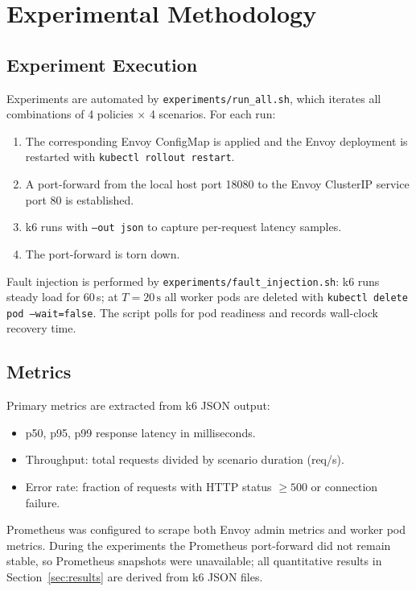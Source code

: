 \documentclass[conference]{IEEEtran}
\begin{document}
\section{Experimental Methodology}
\label{sec:methodology}

\subsection{Experiment Execution}

Experiments are automated by \texttt{experiments/run\_all.sh}, which iterates
all combinations of 4 policies $\times$ 4 scenarios.
For each run:
\begin{enumerate}
  \item The corresponding Envoy ConfigMap is applied and the Envoy deployment
        is restarted with \texttt{kubectl rollout restart}.
  \item A port-forward from the local host port 18080 to the Envoy ClusterIP
        service port 80 is established.
  \item k6 runs with \texttt{--out json} to capture per-request latency samples.
  \item The port-forward is torn down.
\end{enumerate}

Fault injection is performed by \texttt{experiments/fault\_injection.sh}:
k6 runs steady load for 60\,s; at $T = 20\,\text{s}$ all worker pods are
deleted with \texttt{kubectl delete pod --wait=false}.
The script polls for pod readiness and records wall-clock recovery time.

\subsection{Metrics}

Primary metrics are extracted from k6 JSON output:
\begin{itemize}
  \item p50, p95, p99 response latency in milliseconds.
  \item Throughput: total requests divided by scenario duration (req/s).
  \item Error rate: fraction of requests with HTTP status $\ge 500$ or
        connection failure.
\end{itemize}

Prometheus was configured to scrape both Envoy admin metrics and worker pod
metrics.
During the experiments the Prometheus port-forward did not remain stable,
so Prometheus snapshots were unavailable; all quantitative results in
Section~\ref{sec:results} are derived from k6 JSON files.
\end{document}
